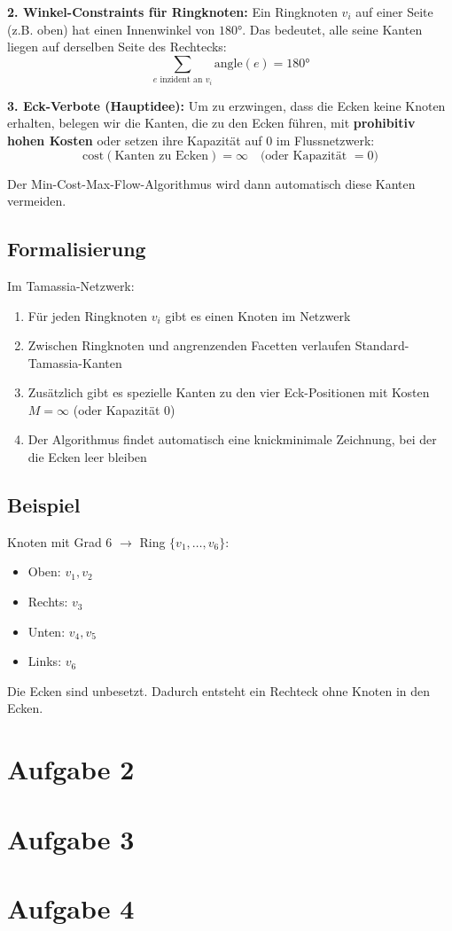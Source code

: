 \documentclass[a4paper]{scrartcl}
\def\to{\ensuremath{\rightarrow}} %
\begin{document}
\textbf{2. Winkel-Constraints für Ringknoten:}
Ein Ringknoten $v_i$ auf einer Seite (z.B. oben) hat einen Innenwinkel von $180°$. Das bedeutet, alle seine Kanten liegen auf derselben Seite des Rechtecks:
$$\sum_{e \text{ inzident an } v_i} \text{angle}(e) = 180°$$

\textbf{3. Eck-Verbote (Hauptidee):}
Um zu erzwingen, dass die Ecken keine Knoten erhalten, belegen wir die Kanten, die zu den Ecken führen, mit \textbf{prohibitiv hohen Kosten} oder setzen ihre Kapazität auf 0 im Flussnetzwerk:
$$\text{cost}(\text{Kanten zu Ecken}) = \infty \quad \text{(oder Kapazität } = 0\text{)}$$

Der Min-Cost-Max-Flow-Algorithmus wird dann automatisch diese Kanten vermeiden.

\subsection*{Formalisierung}

Im Tamassia-Netzwerk:
\begin{enumerate}
    \item Für jeden Ringknoten $v_i$ gibt es einen Knoten im Netzwerk
    \item Zwischen Ringknoten und angrenzenden Facetten verlaufen Standard-Tamassia-Kanten
    \item Zusätzlich gibt es spezielle Kanten zu den vier Eck-Positionen mit Kosten $M = \infty$ (oder Kapazität 0)
    \item Der Algorithmus findet automatisch eine knickminimale Zeichnung, bei der die Ecken leer bleiben
\end{enumerate}

\subsection*{Beispiel}

Knoten mit Grad 6 $\to$ Ring $\{v_1, \ldots, v_6\}$:
\begin{itemize}
    \item Oben: $v_1, v_2$
    \item Rechts: $v_3$
    \item Unten: $v_4, v_5$
    \item Links: $v_6$
\end{itemize}
Die Ecken sind unbesetzt. Dadurch entsteht ein Rechteck ohne Knoten in den Ecken.



\section*{Aufgabe 2}

\section*{Aufgabe 3}

\section*{Aufgabe 4}


\end{document}

